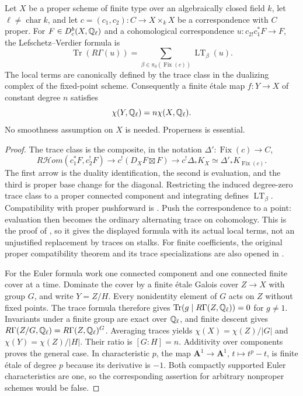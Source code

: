 \begin{theorem}\label{thm:B3-trace}
Let $X$ be a proper scheme of finite type over an algebraically closed
field $k$, let $\ell\ne\operatorname{char}k$, and let
$c=(c_1,c_2):C\to X\times_kX$ be a correspondence with $C$ proper.
For $F\in D^b_c(X,{\mathbb{Q}}_\ell)$ and a cohomological correspondence
$u:c_{2!}c_1^*F\to F$, the Lefschetz--Verdier formula is
\[
 \operatorname{Tr}(R\Gamma(u))
   =\sum_{\beta\in\pi_0(\operatorname{Fix}(c))}\operatorname{LT}_\beta(u).
\]
The local terms are canonically defined by the trace class in the
dualizing complex of the fixed-point scheme.
Consequently a finite \'etale map $f:Y\to X$ of constant degree $n$
satisfies
\[
 \chi(Y,{\mathbb{Q}}_\ell)=n\chi(X,{\mathbb{Q}}_\ell).
\]
No smoothness assumption on $X$ is needed. Properness is essential.
\end{theorem}
\begin{proof}
The trace class is the composite, in the notation
$\Delta':\operatorname{Fix}(c)\to C$,
\[
 R\mathcal Hom(c_1^*F,c_2^!F)
 \longrightarrow c^!(D_XF\boxtimes F)
 \longrightarrow c^!\Delta_*K_X
 \simeq\Delta'_*K_{\operatorname{Fix}(c)}.
\]
The first arrow is the duality identification, the second is evaluation,
and the third is proper base change for the diagonal. Restricting the
induced degree-zero trace class to a proper connected component and
integrating defines $\operatorname{LT}_\beta$.
Compatibility with proper pushforward is
\cite[Proposition 1.2.5, proved in Section 4.3]{BVarshavsky2005}.
Push the correspondence to a point: evaluation then becomes the
ordinary alternating trace on cohomology. This is the proof of
\cite[Corollary 1.2.6]{BVarshavsky2005}, so it gives the displayed
formula with its actual local terms, not an unjustified replacement
by traces on stalks.
For finite coefficients, the original proper compatibility theorem
and its trace specializations are also opened in
\cite[Expos\'e III, Theorem 4.4, p.~102;
Corollaries 4.7--4.8, p.~109]{BSGA5}.

For the Euler formula work one connected component and one connected
finite cover at a time. Dominate the cover by a finite \'etale Galois
cover $Z\to X$ with group $G$, and write $Y=Z/H$. Every nonidentity
element of $G$ acts on $Z$ without fixed points. The trace formula
therefore gives $\operatorname{Tr}(g\mid R\Gamma(Z,{\mathbb{Q}}_\ell))=0$
for $g\ne1$. Invariants under a finite group are exact over
${\mathbb{Q}}_\ell$, and finite descent gives
$R\Gamma(Z/G,{\mathbb{Q}}_\ell)=R\Gamma(Z,{\mathbb{Q}}_\ell)^G$.
Averaging traces yields
$\chi(X)=\chi(Z)/|G|$ and $\chi(Y)=\chi(Z)/|H|$.
Their ratio is $[G:H]=n$. Additivity over components proves the general
case. In characteristic $p$, the map
$\mathbf A^1\to\mathbf A^1$, $t\mapsto t^p-t$, is finite \'etale of
degree $p$ because its derivative is $-1$. Both compactly supported
Euler characteristics are one, so the corresponding assertion for
arbitrary nonproper schemes would be false.
\end{proof}

